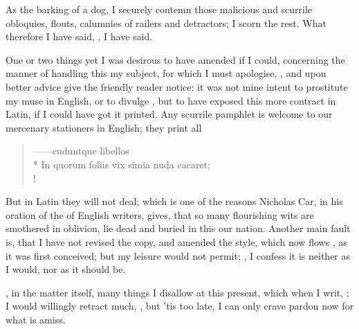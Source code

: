 As the barking of a dog, I securely contemn those malicious and scurrile
obloquies, flouts, calumnies of railers and detractors; I scorn the rest. What
therefore I have said, , I have said.

One or two things yet I was desirous to have amended if I could, concerning the
manner of handling this my subject, for which I must apologise,
, and upon better advice give the friendly reader
notice: it was not mine intent to prostitute my muse in English, or to divulge
, but to have exposed this more contract in Latin, if I
could have got it printed. Any scurrile pamphlet is welcome to our mercenary
stationers in English; they print all

\begin{latin}
\begin{verse}%
------cuduntque libellos\\*
In quorum foliis vix simia nuda cacaret;\\!
\end{verse}%
\end{latin}

But in Latin they will not deal; which is one of the reasons
Nicholas Car, in his oration of the
 of English writers, gives, that so many flourishing
wits are smothered in oblivion, lie dead and buried in this our nation. Another
main fault is, that I have not revised the copy, and amended the style, which
now flows , as it was first conceived; but my
leisure would not permit; , I confess
it is neither as I would, nor as it should be.


, in the matter itself, many things I disallow at this
present, which when I writ, ; I would willingly retract much, \etc{}, but 'tis too late, I can only
crave pardon now for what is amiss.

